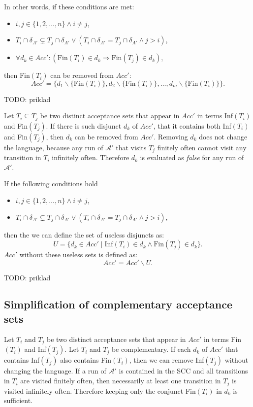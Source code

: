 \documentclass[
  digital, %
  twoside, %
  table,   %
  lof,     %
  lot,     %
]{fithesis3}
\begin{document}
In other words, if these conditions are met:
\begin{itemize}
  \item $i, j \in \{1,2, \dots, n\} \wedge i \neq j$,
  \item $T_i \cap \delta_{A'} \subsetneq T_j \cap \delta_{A'} \vee (T_i \cap \delta_{A'} = T_j \cap \delta_{A'} \wedge j > i)$,
  \item $\forall d_k \in Acc' \colon (\text{Fin}(T_i) \in d_k \Rightarrow \text{Fin}(T_j) \in d_k)$,
\end{itemize}
then Fin$(T_i)$ can be removed from $Acc'$:
\begin{equation*}
  Acc' = \{d_1 \smallsetminus \{\text{Fin}(T_i)\}, d_2 \smallsetminus \{\text{Fin}(T_i)\}, \dots, d_m \smallsetminus \{\text{Fin}(T_i)\}\}.
\end{equation*}

TODO: priklad

Let $T_i \subseteq T_j$ be two distinct acceptance sets that appear in $Acc'$ in terms Inf$(T_i)$ and Fin$(T_j)$. If there is such disjunct $d_k$ of $Acc'$, that it contains both Inf$(T_i)$ and Fin$(T_j)$, then $d_k$ can be removed from $Acc'$. Removing $d_k$ does not change the language, because any run of $\mathcal{A'}$ that visits $T_j$ finitely often cannot visit any transition in $T_i$ infinitely often. Therefore $d_k$ is evaluated as \emph{false} for any run of $\mathcal{A'}$. 

If the following conditions hold
\begin{itemize}
  \item $i, j \in \{1, 2, \dots, n\} \wedge i \neq j$,
  \item $T_i \cap \delta_{A'} \subsetneq T_j \cap \delta_{A'} \vee (T_i \cap \delta_{A'} = T_j \cap \delta_{A'} \wedge j > i)$,
\end{itemize}
then the we can define the set of useless disjuncts as:
\begin{equation*}
  U = \{d_k \in Acc' \mid \text{Inf}(T_i) \in d_k \wedge \text{Fin}(T_j) \in d_k \}.
\end{equation*}
$Acc'$ without these useless sets is defined as:
\begin{equation*}
  Acc' = Acc' \smallsetminus U.
\end{equation*}

TODO: priklad

\subsection{Simplification of complementary acceptance sets}
Let $T_i$ and $T_j$ be two distinct acceptance sets that appear in $Acc'$ in terms Fin$(T_i)$ and Inf$(T_j)$. Let $T_i$ and $T_j$ be complementary. If each $d_k$ of $Acc'$ that contains Inf$(T_j)$ also contains Fin$(T_i)$, then we can remove Inf$(T_j)$ without changing the language. If a run of $\mathcal{A'}$ is contained in the SCC and all transitions in $T_i$ are visited finitely often, then necessarily at least one transition in $T_j$ is visited infinitely often. Therefore keeping only the conjunct Fin$(T_i)$ in $d_k$ is sufficient. 
\end{document}
